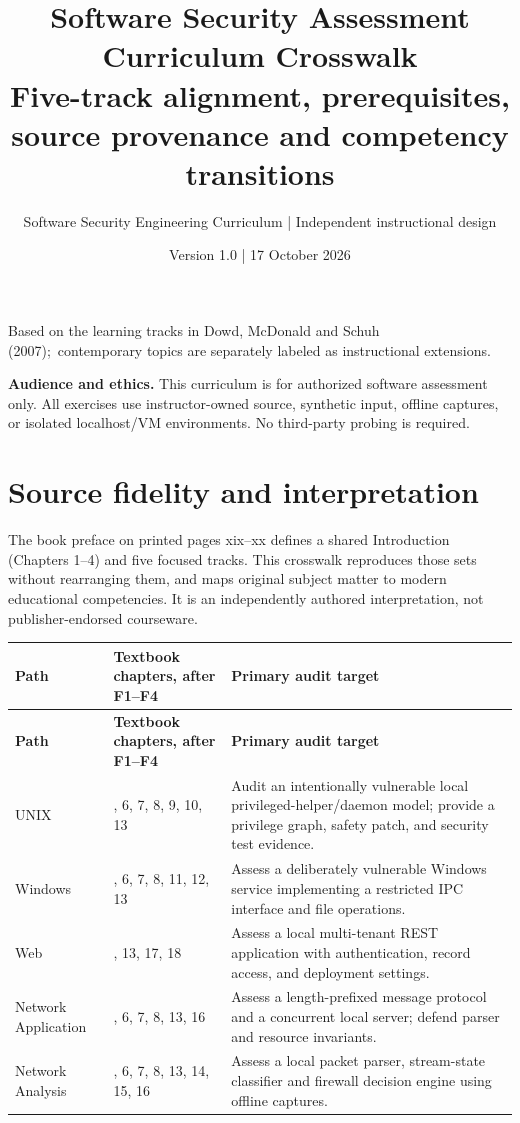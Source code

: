 \documentclass[10pt,letterpaper]{article}
\title{\vspace{-1.6cm}\Huge\color{navy}\bfseries Software Security Assessment Curriculum Crosswalk\\[8pt]\large\color{teal}Five-track alignment, prerequisites, source provenance and competency transitions}
\author{Software Security Engineering Curriculum | Independent instructional design}
\date{Version 1.0 | 17 October 2026}
\begin{document}
\maketitle
\begin{center}\small Based on the learning tracks in Dowd, McDonald and Schuh (2007);\
contemporary topics are separately labeled as instructional extensions.\end{center}
\begin{insight}\textbf{Audience and ethics.} This curriculum is for authorized software assessment only. All exercises use instructor-owned source, synthetic input, offline captures, or isolated localhost/VM environments. No third-party probing is required.\end{insight}
\tableofcontents
\clearpage
\section{Source fidelity and interpretation}
The book preface on printed pages xix--xx defines a shared Introduction (Chapters 1--4) and five focused tracks. This crosswalk reproduces those sets without rearranging them, and maps original subject matter to modern educational competencies. It is an independently authored interpretation, not publisher-endorsed courseware.

\begingroup\footnotesize\setlength\tabcolsep{3pt}
\begin{longtable}{>{\raggedright\arraybackslash}p{}>{\raggedright\arraybackslash}p{}>{\raggedright\arraybackslash}p{}}\toprule
\textbf{Path} & \textbf{Textbook chapters, after F1--F4} & \textbf{Primary audit target}\\\midrule\endfirsthead
\toprule \textbf{Path} & \textbf{Textbook chapters, after F1--F4} & \textbf{Primary audit target}\\\midrule\endhead
UNIX & 5, 6, 7, 8, 9, 10, 13 & Audit an intentionally vulnerable local privileged-helper/daemon model; provide a privilege graph, safety patch, and security test evidence.\\\midrule
Windows & 5, 6, 7, 8, 11, 12, 13 & Assess a deliberately vulnerable Windows service implementing a restricted IPC interface and file operations.\\\midrule
Web & 8, 13, 17, 18 & Assess a local multi-tenant REST application with authentication, record access, and deployment settings.\\\midrule
Network Application & 5, 6, 7, 8, 13, 16 & Assess a length-prefixed message protocol and a concurrent local server; defend parser and resource invariants.\\\midrule
Network Analysis & 5, 6, 7, 8, 13, 14, 15, 16 & Assess a local packet parser, stream-state classifier and firewall decision engine using offline captures.\\\midrule
\bottomrule\end{longtable}\endgroup
\end{document}
